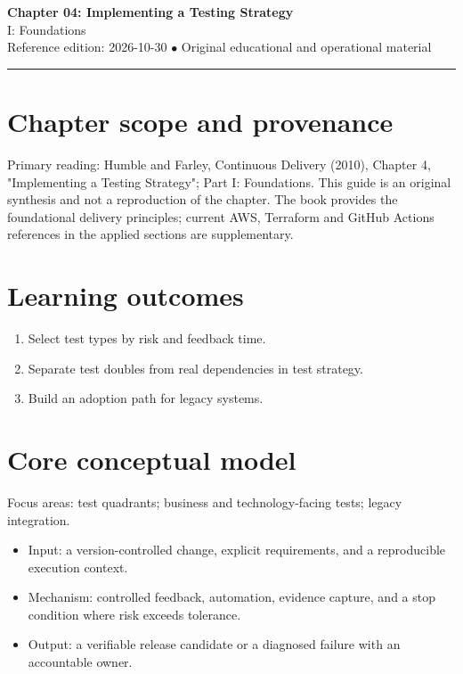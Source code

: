 \documentclass[10pt,letterpaper]{article}
\begin{document}
\begin{center}
{\LARGE\bfseries\color{cdblue}Chapter 04: Implementing a Testing Strategy}\\[7pt]
{\large I: Foundations}\\[6pt]
{\small Reference edition: 2026-10-30 $\bullet$ Original educational and operational material}
\end{center}
\noindent\color{cdblue}\rule{\linewidth}{1.2pt}\color{black}
\vspace{0.4em}
\section{Chapter scope and provenance}
Primary reading: Humble and Farley, Continuous Delivery (2010), Chapter 4, "Implementing a Testing Strategy"; Part I: Foundations. This guide is an original synthesis and not a reproduction of the chapter. The book provides the foundational delivery principles; current AWS, Terraform and GitHub Actions references in the applied sections are supplementary.


\section{Learning outcomes}
\begin{enumerate}
\item Select test types by risk and feedback time.
\item Separate test doubles from real dependencies in test strategy.
\item Build an adoption path for legacy systems.
\end{enumerate}

\section{Core conceptual model}
Focus areas: test quadrants; business and technology-facing tests; legacy integration.

\begin{itemize}
\item Input: a version-controlled change, explicit requirements, and a reproducible execution context.
\item Mechanism: controlled feedback, automation, evidence capture, and a stop condition where risk exceeds tolerance.
\item Output: a verifiable release candidate or a diagnosed failure with an accountable owner.
\end{itemize}
\end{document}
